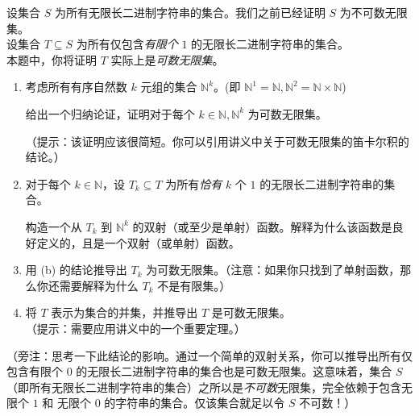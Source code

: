 \begin{exercise}
    设集合 $S$ 为所有无限长二进制字符串的集合。我们之前已经证明 $S$ 为不可数无限集。\\
    设集合 $T \subseteq S$ 为所有仅包含\emph{有限个} $1$ 的无限长二进制字符串的集合。\\
    本题中，你将证明 $T$ 实际上是\emph{可数无限集}。
    \begin{enumerate}[label=(\alph*)]
        \item 考虑所有有序自然数 $k$ 元组的集合 $\mathbb{N}^k$。(即 $\mathbb{N}^1 = \mathbb{N}, \mathbb{N}^2 = \mathbb{N} \times \mathbb{N}$)

              给出一个归纳论证，证明对于每个 $k \in \mathbb{N}, \mathbb{N}^k$ 为可数无限集。

              （提示：该证明应该很简短。你可以引用讲义中关于可数无限集的笛卡尔积的结论。）
        \item 对于每个 $k \in \mathbb{N}$，设 $T_k \subseteq T$ 为所有\emph{恰有} $k$ 个 $1$ 的无限长二进制字符串的集合。

              构造一个从 $T_k$ 到 $\mathbb{N}^k$ 的双射（或至少是单射）函数。解释为什么该函数是良好定义的，且是一个双射（或单射）函数。
        \item 用 (b) 的结论推导出 $T_k$ 为可数无限集。（注意：如果你只找到了单射函数，那么你还需要解释为什么 $T_k$ 不是有限集。）
        \item 将 $T$ 表示为集合的并集，并推导出 $T$ 是可数无限集。\\
              （提示：需要应用讲义中的一个重要定理。）
    \end{enumerate}
    （旁注：思考一下此结论的影响。通过一个简单的双射关系，你可以推导出所有仅包含有限个 $0$ 的无限长二进制字符串的集合也是可数无限集。这意味着，集合 $S$（即所有无限长二进制字符串的集合）之所以是\emph{不可数}无限集，完全依赖于包含无限个 $1$ 和 无限个 $0$ 的字符串的集合。仅该集合就足以令 $S$ 不可数！）
\end{exercise}

